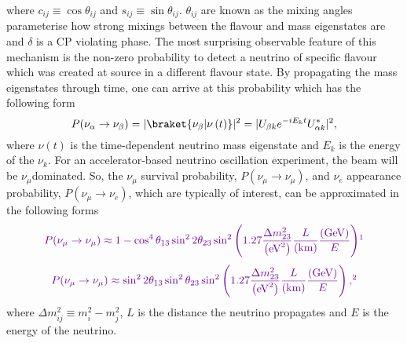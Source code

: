 where $c_{ij} \equiv \cos\theta_{ij}$ and $s_{ij} \equiv \sin\theta_{ij}$. $\theta_{ij}$ are known as the mixing angles  parameterise how strong mixings between the flavour and mass eigenstates are and $\delta$ is a CP violating phase.  The most surprising observable feature of this mechanism is the non-zero probability to detect a neutrino of specific flavour which was created at source in a different flavour state.  By propagating the mass eigenstates through time, one can arrive at this probability which has the following form
\begin{equation}
P(\nu_\alpha \rightarrow \nu_\beta) = |\braket{\nu_\beta|\nu\left(t\right)}|^2 = |U_{\beta k} e^{-iE_{k}t}  U^{\ast}_{\alpha k}|^2,
\label{eq:NeutrinoOscillationProbability}
\end{equation}
where $\nu\left(t\right)$ is the time-dependent neutrino mass eigenstate and $E_k$ is the energy of the $\nu_k$.  For an accelerator-based neutrino oscillation experiment, the beam will be $\nu_\mu$dominated.  So, the $\nu_\mu$ survival probability, $P(\nu_\mu \rightarrow \nu_\mu)$, and $\nu_e$ appearance probability, $P(\nu_\mu \rightarrow \nu_e)$, which are typically of interest, can be approximated in the following forms\Yoshi{:}{}
\begin{equation}
  \Yoshi{P(\nu_\mu \rightarrow \nu_\mu) \approx 1 - \cos^{4}\theta_{13}\sin^{2}2\theta_{23}\sin^2\left(1.27\frac{\Delta m^{2}_{23}}{\left(\textrm{eV}^2\right)}\frac{L}{\left(\textrm{km}\right)}\frac{\left(\textrm{GeV}\right)}{E}\right)}{would units not be in square brackets?}
  \label{eq:MuonNeutrinoSurvivalProbability}
\end{equation}
\begin{equation}
  \Yoshi{P(\nu_\mu \rightarrow \nu_\mu) \approx \sin^{2}2\theta_{13}\sin^{2}\theta_{23}\sin^2\left(1.27\frac{\Delta m^{2}_{23}}{\left(\textrm{eV}^2\right)}\frac{L}{\left(\textrm{km}\right)}\frac{\left(\textrm{GeV}\right)}{E}\right),}{would units not be in square brackets?}
  \label{eq:ElectronNeutrinoAppearanceProbability}
\end{equation}
where $\Delta m^{2}_{ij} \equiv m^{2}_{i} - m^{2}_{j}$, $L$ is the distance the neutrino propagates and $E$ is the energy of the neutrino.

